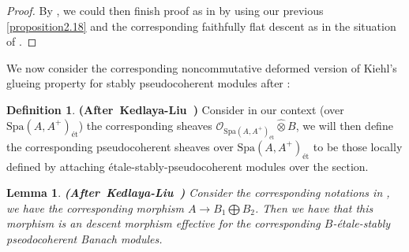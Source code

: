 \documentclass[12pt]{amsart}
\newtheorem{lemma}[theorem]{Lemma}
\theoremstyle{definition}
\newtheorem{definition}[theorem]{Definition}
\numberwithin{equation}{section}
\begin{document}
\begin{proof}
By \cite[Proposition 8.2.21]{KL1}, we could then finish proof as in \cite[Theorem 2.5.11]{KL2} by using our previous \cref{proposition2.18} and the corresponding faithfully flat descent as in the situation of \cite[Theorem 2.5.11]{KL2}.	
\end{proof}


\indent We now consider the corresponding noncommutative deformed version of Kiehl's glueing property for stably pseudocoherent modules after \cite[Definition 2.5.12]{KL2}:



\begin{definition} \mbox{\bf{(After Kedlaya-Liu \cite[Definition 2.5.12]{KL2})}}
Consider in our context (over $\mathrm{Spa}(A,A^+)_{\text{\'et}}$) the corresponding sheaves $\mathcal{O}_{\mathrm{Spa}(A,A^+)_{\text{\'et}}}\widehat{\otimes}B$, we will then define the corresponding pseudocoherent sheaves over $\mathrm{Spa}(A,A^+)_{\text{\'et}}$ to be those locally defined by attaching \'etale-stably-pseudocoherent modules over the section. 
\end{definition}



\begin{lemma} \mbox{\bf{(After Kedlaya-Liu \cite[Lemma 2.5.13]{KL2})}} \label{lemma2.21}
	Consider the corresponding notations in \cite[Lemma 2.4.10]{KL2}, we have the corresponding morphism $A\rightarrow B_1\bigoplus B_2$. Then we have that this morphism is an descent morphism effective for the corresponding $B$-\'etale-stably pseodocoherent Banach modules. 
\end{lemma}
\end{document}

